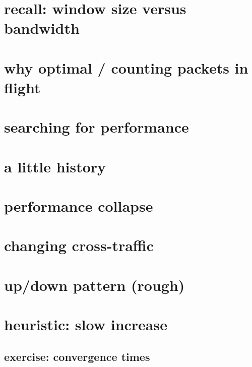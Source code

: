 
\section{recall: window size versus bandwidth}



\section{why optimal / counting packets in flight}


\section{searching for performance}


\section{a little history}



\section{performance collapse}



\section{changing cross-traffic}


\section{up/down pattern (rough)}


\section{heuristic: slow increase}


\subsection{exercise: convergence times}


